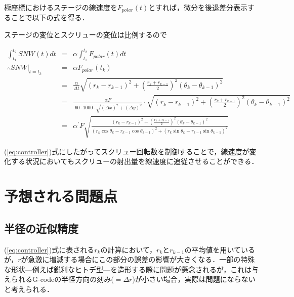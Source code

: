 \documentclass[twocolumn,oneside,a4paper]{article}
\begin{document}
極座標におけるステージの線速度を$F_{polar}(t)$とすれば，微分を後退差分表示することで以下の式を得る．


ステージの変位とスクリューの変位は比例するので
\begin{strip}
\begin{eqnarray}\label{eq:controller}
\int_{t_1}^{t_2} SNW(t)dt &=& \alpha \int_{t_1}^{t_2} F_{polar}(t) dt \nonumber \\
\therefore SNW\big|_{t=t_k} &=& \alpha F_{polar}(t_k)  \nonumber \\
&=& \frac{\alpha}{\Delta t} \sqrt{\left( r_k - r_{k-1} \right)^2 + \left(\frac{r_k+r_{k-1}}{2} \right)^2 \left( \theta_k - \theta_{k-1} \right)^2} \nonumber \\
&=& \frac{\alpha F}{\cdot 60\cdot1000 \cdot \sqrt{(\Delta x)^2+(\Delta y)^2}} \cdot \sqrt{\left( r_k - r_{k-1} \right)^2 + \left(\frac{r_k+r_{k-1}}{2} \right)^2  \left( \theta_k - \theta_{k-1} \right)^2} \nonumber \\
&=& \alpha^\prime F \sqrt{\frac{ \left( r_k - r_{k-1} \right)^2 + \left(\frac{r_k+r_{k-1}}{2} \right)^2  \left( \theta_k - \theta_{k-1} \right)^2 } {(r_k \cos\theta_k - r_{k-1} \cos\theta_{k-1})^2+(r_k \sin\theta_k - r_{k-1} \sin\theta_{k-1})^2 }}
\end{eqnarray}
\end{strip}


(\ref{eq:controller})式にしたがってスクリュー回転数を制御することで，線速度が変化する状況においてもスクリューの射出量を線速度に追従させることができる．

\section{予想される問題点}
\subsection{半径の近似精度}
(\ref{eq:controller})式に表される$r_k$の計算において，$r_k$と$r_{k-1}$の平均値を用いているが，$r$が急激に増減する場合にこの部分の誤差の影響が大きくなる．一部の特殊な形状—例えば鋭利なヒトデ型—を造形する際に問題が懸念されるが，これは与えられるG-codeの半径方向の刻み($ = \Delta r$)が小さい場合，実際は問題にならないと考えられる．
\end{document}
